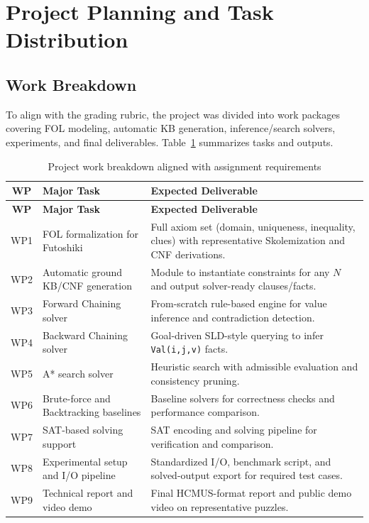 \section{Project Planning and Task Distribution}
\subsection{Work Breakdown}
To align with the grading rubric, the project was divided into work packages covering FOL modeling, automatic KB generation, inference/search solvers, experiments, and final deliverables. Table~\ref{tab:work-breakdown} summarizes tasks and outputs.

{\small
\begin{longtable}{|c|>{\RaggedRight\arraybackslash}p{4.8cm}|>{\RaggedRight\arraybackslash}p{8.6cm}|}
\caption{Project work breakdown aligned with assignment requirements}\label{tab:work-breakdown}\\
\hline
\textbf{WP} & \textbf{Major Task} & \textbf{Expected Deliverable} \\
\hline
\endfirsthead
\hline
\textbf{WP} & \textbf{Major Task} & \textbf{Expected Deliverable} \\
\hline
\endhead
\hline
\endfoot
\hline
\endlastfoot
WP1 & FOL formalization for Futoshiki & Full axiom set (domain, uniqueness, inequality, clues) with representative Skolemization and CNF derivations. \\
\hline
WP2 & Automatic ground KB/CNF generation & Module to instantiate constraints for any \(N\) and output solver-ready clauses/facts. \\
\hline
WP3 & Forward Chaining solver & From-scratch rule-based engine for value inference and contradiction detection. \\
\hline
WP4 & Backward Chaining solver & Goal-driven SLD-style querying to infer \texttt{Val(i,j,v)} facts. \\
\hline
WP5 & A* search solver & Heuristic search with admissible evaluation and consistency pruning. \\
\hline
WP6 & Brute-force and Backtracking baselines & Baseline solvers for correctness checks and performance comparison. \\
\hline
WP7 & SAT-based solving support & SAT encoding and solving pipeline for verification and comparison. \\
\hline
WP8 & Experimental setup and I/O pipeline & Standardized I/O, benchmark script, and solved-output export for required test cases. \\
\hline
WP9 & Technical report and video demo & Final HCMUS-format report and public demo video on representative puzzles. \\
\hline
\end{longtable}
}

